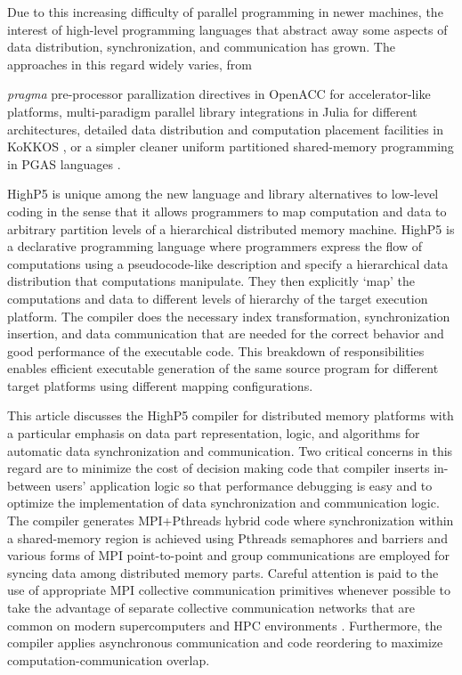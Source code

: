 \documentclass[ASNA,twocolumn]{USG} %
\begin{document}
Due to this increasing difficulty of parallel programming in newer machines, the interest of high-level programming languages that abstract away some aspects of data distribution, synchronization, and communication has grown. The approaches in this regard widely varies, from {\textit{pragma} pre-processor parallization directives in OpenACC \citep{farber2016parallel} for accelerator-like platforms, multi-paradigm parallel library integrations in Julia \citep{lin2021comparing} for different architectures, detailed data distribution and computation placement facilities in KoKKOS \citep{trott2021kokkos}, or a simpler cleaner uniform partitioned shared-memory programming in PGAS languages \citep{Yelick:2007:PPU:1278177.1278183}. 
	
    
HighP5 \citep{yanhaona2024highp5} is unique among the new language and library alternatives to low-level coding in the sense that it allows programmers to map computation and data to arbitrary partition levels of a hierarchical distributed memory machine. HighP5 is a declarative programming language where programmers express the flow of computations using a pseudocode-like description and specify a hierarchical data distribution that computations manipulate. They then explicitly `map' the computations and data to different levels of hierarchy of the target execution platform. The compiler does the necessary index transformation, synchronization insertion, and data communication that are needed for the correct behavior and good performance of the executable code. This breakdown of responsibilities enables efficient executable generation of the same source program for different target platforms using different mapping configurations.  
	
This article discusses the HighP5 compiler for distributed memory platforms with a particular emphasis on data part representation, logic, and algorithms for automatic data synchronization and communication. Two critical concerns in this regard are to minimize the cost of decision making code that compiler inserts in-between users' application logic so that performance debugging is easy and to optimize the implementation of data synchronization and communication logic. The compiler generates MPI+Pthreads hybrid code where synchronization within a shared-memory region is achieved using Pthreads semaphores and barriers and various forms of MPI point-to-point and group communications are employed for syncing data among distributed memory parts. Careful attention is paid to the use of appropriate MPI collective communication primitives whenever possible to take the advantage of separate collective communication networks that are common on modern supercomputers \citep{10.1145/1088149.1088183} and HPC environments \citep{6490322}\citep{10.1145/329366.301116}. Furthermore, the compiler applies asynchronous communication and code reordering to maximize computation-communication overlap. 
	
}
\end{document}
